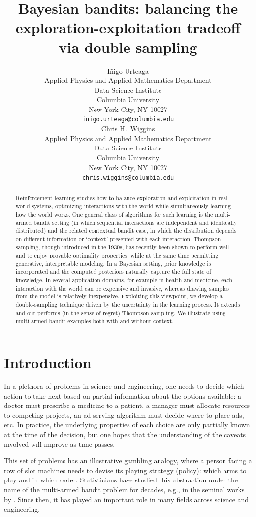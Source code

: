 \documentclass{article}
\title{Bayesian bandits: balancing the exploration-exploitation tradeoff via double sampling}
\author{
	I\~{n}igo Urteaga\\
	Applied Physics and Applied Mathematics Department\\
	Data Science Institute\\
	Columbia University\\
	New York City, NY 10027\\
	\texttt{inigo.urteaga@columbia.edu} \\
	\And
	Chris H.~Wiggins\\
	Applied Physics and Applied Mathematics Department\\
	Data Science Institute\\
	Columbia University\\
	New York City, NY 10027\\
	\texttt{chris.wiggins@columbia.edu}
}
\begin{document}
\maketitle

\begin{abstract}
Reinforcement learning studies how to balance exploration and exploitation in real-world systems, optimizing interactions with the world while simultaneously learning how the world works. One general class of algorithms for such learning is the multi-armed bandit setting (in which sequential interactions are independent and identically distributed) and the related contextual bandit case, in which the distribution depends on different information or `context' presented with each interaction. Thompson sampling, though introduced in the 1930s, has recently been shown to perform well and to enjoy provable optimality properties, while at the same time permitting generative, interpretable modeling. In a Bayesian setting, prior knowledge is incorporated and the computed posteriors naturally capture the full state of knowledge. In several application domains, for example in health and medicine, each interaction with the world can be expensive and invasive, whereas drawing samples from the model is relatively inexpensive. Exploiting this viewpoint, we develop a double-sampling technique driven by the uncertainty in the learning process. It extends and out-performs (in the sense of regret) Thompson sampling. We illustrate using multi-armed bandit examples both with and without context.
\end{abstract}

\section{Introduction}
\label{sec:introduction}

In a plethora of problems in science and engineering, one needs to decide which action to take next based on partial information about the options available: a doctor must prescribe a medicine to a patient, a manager must allocate resources to competing projects, an ad serving algorithm must decide where to place ads, etc. In practice, the underlying properties of each choice are only partially known at the time of the decision, but one hopes that the understanding of the caveats involved will improve as time passes.

This set of problems has an illustrative gambling analogy, where a person facing a row of slot machines needs to devise its playing strategy (policy): which arms to play and in which order. Statisticians have studied this abstraction under the name of the multi-armed bandit problem for decades, e.g., in the seminal works by \cite{j-Robbins1956,j-Robbins1952}. Since then, it has played an important role in many fields across science and engineering.
\end{document}
